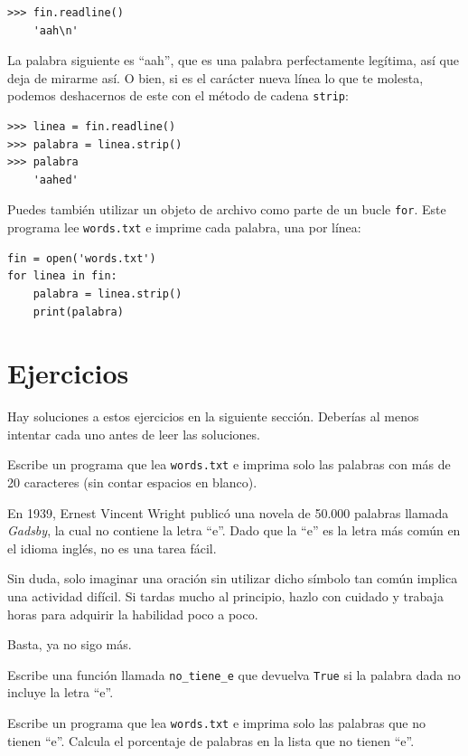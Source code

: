 \documentclass[10pt]{book}
\begin{document}
\begin{verbatim}
>>> fin.readline()
    'aah\n'
\end{verbatim}
%
La palabra siguiente es ``aah'', que es una palabra perfectamente legítima,
así que deja de mirarme así.
O bien, si es el carácter nueva línea lo que te molesta,
podemos deshacernos de este con el método de cadena {\tt strip}:

\begin{verbatim}
>>> linea = fin.readline()
>>> palabra = linea.strip()
>>> palabra
    'aahed'
\end{verbatim}
%
Puedes también utilizar un objeto de archivo como parte de un bucle {\tt for}.
Este programa lee {\tt words.txt} e imprime cada palabra, una
por línea:

\begin{verbatim}
fin = open('words.txt')
for linea in fin:
    palabra = linea.strip()
    print(palabra)
\end{verbatim}
%

\section{Ejercicios}

Hay soluciones a estos ejercicios en la siguiente sección.
Deberías al menos intentar cada uno antes de leer las soluciones.

\begin{exercise}
Escribe un programa que lea {\tt words.txt} e imprima solo las
palabras con más de 20 caracteres (sin contar espacios en blanco).

\end{exercise}

\begin{exercise}

En 1939, Ernest Vincent Wright publicó una novela de 50.000 palabras llamada
{\em Gadsby}, la cual no contiene la letra ``e''.  Dado que la ``e'' es
la letra más común en el idioma inglés, no es una tarea fácil.

Sin duda, solo imaginar una oración sin utilizar dicho símbolo tan común
implica una actividad difícil.  Si tardas mucho al principio, hazlo con cuidado
y trabaja horas para adquirir la habilidad poco a poco.

Basta, ya no sigo más.

Escribe una función llamada \verb"no_tiene_e" que devuelva {\tt True} si
la palabra dada no incluye la letra ``e''.

Escribe un programa que lea {\tt words.txt} e imprima solo las palabras
que no tienen ``e''.  Calcula el porcentaje de palabras en la lista
que no tienen ``e''.

\end{exercise}
\end{document}
